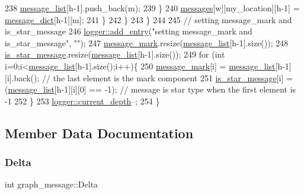\begin{DoxyCode}
238           \hyperlink{classgraph__message_aa17fdb629b423343edfafa97252763ef}{message\_list}[h-1].push\_back(m);
239         \}
240         \hyperlink{classgraph__message_aac77e098f0acf9650116a8e51fe3b4b7}{messages}[w][my\_location][h-1] = \hyperlink{classgraph__message_ab54d89b122c2b1322da0d5db2043fb84}{message\_dict}[h-1][m];
241       \}
242     \}
243   \}
244 
245   \textcolor{comment}{// setting message\_mark and is\_star\_message}
246   \hyperlink{classlogger_a710163deb17bc81f70d53d285b8ac9ac}{logger::add\_entry}(\textcolor{stringliteral}{"setting message\_mark and is\_star\_message"}, \textcolor{stringliteral}{""});
247   \hyperlink{classgraph__message_a49d9af5150daf0599c29fe18cb032fa5}{message\_mark}.resize(\hyperlink{classgraph__message_aa17fdb629b423343edfafa97252763ef}{message\_list}[h-1].size());
248   \hyperlink{classgraph__message_a55ff5531a0043106369e84a7bc45e22d}{is\_star\_message}.resize(\hyperlink{classgraph__message_aa17fdb629b423343edfafa97252763ef}{message\_list}[h-1].size());
249   \textcolor{keywordflow}{for} (\textcolor{keywordtype}{int} i=0;i<\hyperlink{classgraph__message_aa17fdb629b423343edfafa97252763ef}{message\_list}[h-1].size();i++)\{
250     \hyperlink{classgraph__message_a49d9af5150daf0599c29fe18cb032fa5}{message\_mark}[i] = \hyperlink{classgraph__message_aa17fdb629b423343edfafa97252763ef}{message\_list}[h-1][i].back(); \textcolor{comment}{// the last element is the mark
       component}
251     \hyperlink{classgraph__message_a55ff5531a0043106369e84a7bc45e22d}{is\_star\_message}[i] = (\hyperlink{classgraph__message_aa17fdb629b423343edfafa97252763ef}{message\_list}[h-1][i][0] == -1); \textcolor{comment}{// message is star
       type when the first element is -1}
252   \}
253   \hyperlink{classlogger_a9d29b49bd318a719a8e85b59eac54fe0}{logger::current\_depth}--;
254 \}
\end{DoxyCode}


\subsection{Member Data Documentation}
\mbox{\label{classgraph__message_a45dfd061b7bc73572e5132fbf66efd55}} 
\subsubsection{\texorpdfstring{Delta}{Delta}}
{\footnotesize\ttfamily int graph\+\_\+message\+::\+Delta\hspace{0.3cm}{\ttfamily [private]}}



